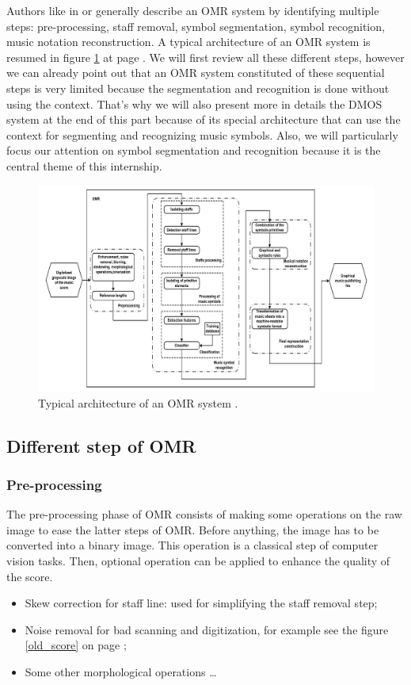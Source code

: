 \documentclass[11pt]{sdm}
\begin{document}
Authors like in \cite{rebelo_optical_2012} or \cite{fornes_analysis_2014} generally describe an OMR system by identifying multiple steps: pre-processing, staff removal, symbol segmentation, symbol recognition, music notation reconstruction.
A typical architecture of an OMR system is resumed in figure \ref{typical_omr} at page \pageref{typical_omr}.
We will first review all these different steps, however we can already point out that an OMR system constituted of these sequential steps is very limited because the segmentation and recognition is done without using the context.
That's why we will also present more in details the DMOS system at the end of this part because of its special architecture that can use the context for segmenting and recognizing music symbols.
Also, we will particularly focus our attention on symbol segmentation and recognition because it is the central theme of this internship.
\begin{figure}[btp]
  \centering
  \includegraphics[scale=0.8]{img/typical_omr}
  \caption{\label{typical_omr} Typical architecture of an OMR system \cite{rebelo_optical_2012}. }
\end{figure}

\subsection{Different step of OMR} \label{ssec:omr_steps}

\subsubsection{Pre-processing}

The pre-processing phase of OMR consists of making some operations on the raw image to ease the latter steps of OMR.
Before anything, the image has to be converted into a binary image.
This operation is a classical step of computer vision tasks.
Then, optional operation can be applied to enhance the quality of the score.
\begin{itemize}
  \item Skew correction for staff line: used for simplifying the staff removal step;
  \item Noise removal for bad scanning and digitization, for example see the figure \ref{old_score} on page \pageref{old_score};
  \item Some other morphological operations \ldots
\end{itemize}
\end{document}
